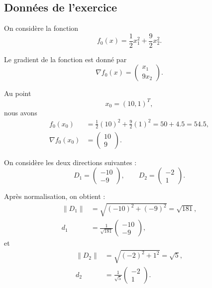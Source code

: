 \documentclass[a4paper,12pt]{article}
\begin{document}
	\subsection{Données de l'exercice}
	
	On considère la fonction
	\begin{equation}
	f_0(x)=\frac{1}{2}x_1^2+\frac{9}{2}x_2^2.
	\end{equation}
	
	Le gradient de la fonction est donné par
	\begin{equation}
	\nabla f_0(x)=
	\begin{pmatrix}
	x_1\\
	9x_2
	\end{pmatrix}.
	\end{equation}
	
	Au point
	\[
	x_0=(10,1)^T,
	\]
	nous avons
	\begin{align}
	f_0(x_0) &= \frac{1}{2}(10)^2+\frac{9}{2}(1)^2 = 50+4.5 = 54.5,\\
	\nabla f_0(x_0) &=
	\begin{pmatrix}
	10\\
	9
	\end{pmatrix}.
	\end{align}
	
	On considère les deux directions suivantes :
	\[
	D_1=
	\begin{pmatrix}
	-10\\
	-9
	\end{pmatrix},
	\qquad
	D_2=
	\begin{pmatrix}
	-2\\
	1
	\end{pmatrix}.
	\]
	
	Après normalisation, on obtient :
	\begin{align}
	\|D_1\| &= \sqrt{(-10)^2+(-9)^2}=\sqrt{181},\\
	d_1 &= \frac{1}{\sqrt{181}}
	\begin{pmatrix}
	-10\\
	-9
	\end{pmatrix},
	\end{align}
	et
	\begin{align}
	\|D_2\| &= \sqrt{(-2)^2+1^2}=\sqrt{5},\\
	d_2 &= \frac{1}{\sqrt{5}}
	\begin{pmatrix}
	-2\\
	1
	\end{pmatrix}.
	\end{align}
	
\end{document}
